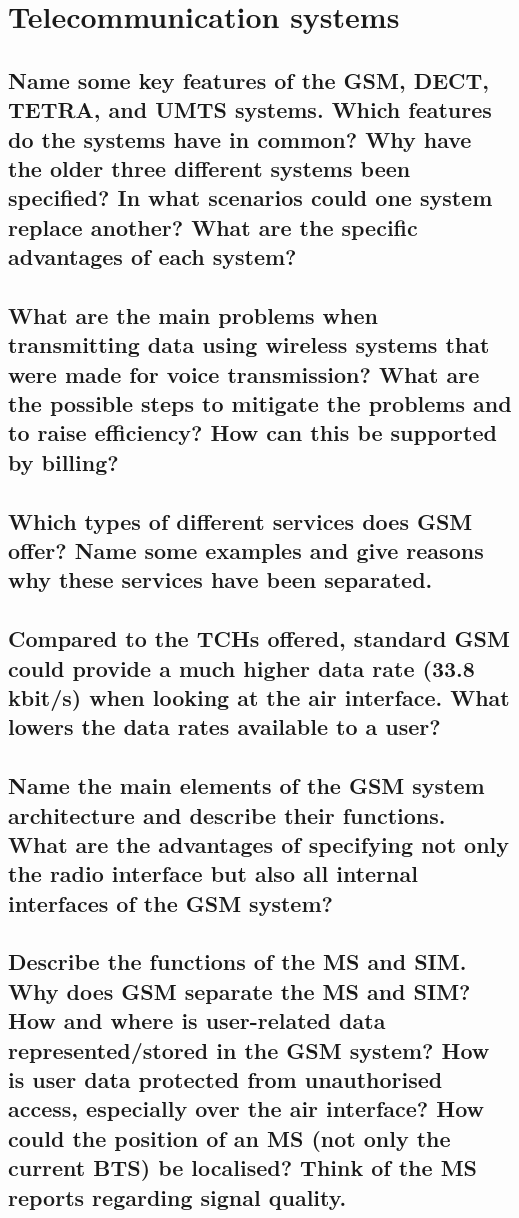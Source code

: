 \section{Telecommunication systems}

\subsection{Name some key features of the GSM, DECT, TETRA, and UMTS systems. Which
features do the systems have in common? Why have the older three different
systems been specified? In what scenarios could one system replace another? What
are the specific advantages of each system?}

\subsection{What are the main problems when transmitting data using wireless systems that were
made for voice transmission? What are the possible steps to mitigate the problems
and to raise efficiency? How can this be supported by billing?}

\subsection{Which types of different services does GSM offer? Name some examples and give
reasons why these services have been separated.}

\subsection{Compared to the TCHs offered, standard GSM could provide a much higher data rate
(33.8 kbit/s) when looking at the air interface. What lowers the data rates available to
a user?}

\subsection{Name the main elements of the GSM system architecture and describe their
functions. What are the advantages of specifying not only the radio interface but also
all internal interfaces of the GSM system?}

\subsection{Describe the functions of the MS and SIM. Why does GSM separate the MS and
SIM? How and where is user-related data represented/stored in the GSM system?
How is user data protected from unauthorised access, especially over the air
interface? How could the position of an MS (not only the current BTS) be localised?
Think of the MS reports regarding signal quality.}


